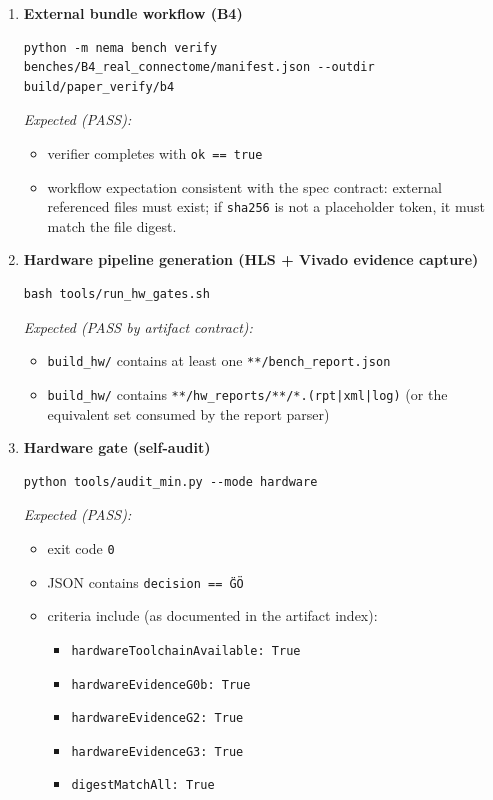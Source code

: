 \begin{enumerate}
\item \textbf{External bundle workflow (B4)}
\begin{verbatim}
python -m nema bench verify benches/B4_real_connectome/manifest.json --outdir build/paper_verify/b4
\end{verbatim}
\textit{Expected (PASS):}
\begin{itemize}
\item verifier completes with \texttt{ok == true}
\item workflow expectation consistent with the spec contract: external referenced files must exist; if \texttt{sha256} is not a placeholder token, it must match the file digest.
\end{itemize}

\item \textbf{Hardware pipeline generation (HLS + Vivado evidence capture)}
\begin{verbatim}
bash tools/run_hw_gates.sh
\end{verbatim}
\textit{Expected (PASS by artifact contract):}
\begin{itemize}
\item \texttt{build\_hw/} contains at least one \texttt{**/bench\_report.json}
\item \texttt{build\_hw/} contains \texttt{**/hw\_reports/**/*.(rpt|xml|log)} (or the equivalent set consumed by the report parser)
\end{itemize}

\item \textbf{Hardware gate (self-audit)}
\begin{verbatim}
python tools/audit_min.py --mode hardware
\end{verbatim}
\textit{Expected (PASS):}
\begin{itemize}
\item exit code \texttt{0}
\item JSON contains \texttt{decision == \"GO\"}
\item criteria include (as documented in the artifact index):
\begin{itemize}
\item \texttt{hardwareToolchainAvailable: True}
\item \texttt{hardwareEvidenceG0b: True}
\item \texttt{hardwareEvidenceG2: True}
\item \texttt{hardwareEvidenceG3: True}
\item \texttt{digestMatchAll: True}
\end{itemize}
\end{itemize}


\end{enumerate}
